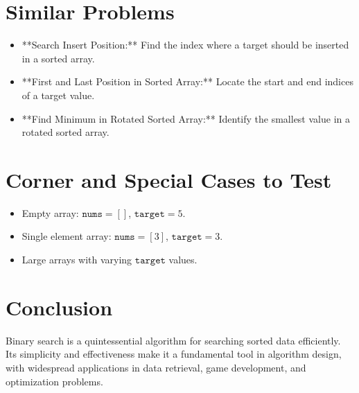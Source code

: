 \section*{Similar Problems}
\begin{itemize}
    \item **Search Insert Position:** Find the index where a target should be inserted in a sorted array.
    \item **First and Last Position in Sorted Array:** Locate the start and end indices of a target value.
    \item **Find Minimum in Rotated Sorted Array:** Identify the smallest value in a rotated sorted array.
\end{itemize}

\section*{Corner and Special Cases to Test}
\begin{itemize}
    \item Empty array: \( \texttt{nums} = [] \), \( \texttt{target} = 5 \).
    \item Single element array: \( \texttt{nums} = [3] \), \( \texttt{target} = 3 \).
    \item Large arrays with varying \( \texttt{target} \) values.
\end{itemize}

\section*{Conclusion}
Binary search is a quintessential algorithm for searching sorted data efficiently. Its simplicity and effectiveness make it a fundamental tool in algorithm design, with widespread applications in data retrieval, game development, and optimization problems.